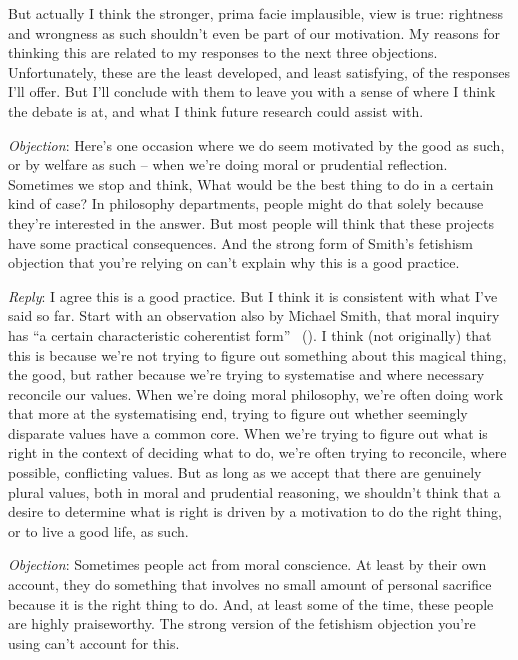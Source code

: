 \documentclass[
  10pt,
  letterpaper,
  DIV=11,
  numbers=noendperiod,
  twoside]{scrartcl}
\begin{document}
But actually I think the stronger, prima facie implausible, view is
true: rightness and wrongness as such shouldn't even be part of our
motivation. My reasons for thinking this are related to my responses to
the next three objections. Unfortunately, these are the least developed,
and least satisfying, of the responses I'll offer. But I'll conclude
with them to leave you with a sense of where I think the debate is at,
and what I think future research could assist with.

\emph{Objection}: Here's one occasion where we do seem motivated by the
good as such, or by welfare as such -- when we're doing moral or
prudential reflection. Sometimes we stop and think, What would be the
best thing to do in a certain kind of case? In philosophy departments,
people might do that solely because they're interested in the answer.
But most people will think that these projects have some practical
consequences. And the strong form of Smith's fetishism objection that
you're relying on can't explain why this is a good practice.

\emph{Reply}: I agree this is a good practice. But I think it is
consistent with what I've said so far. Start with an observation also by
Michael Smith, that moral inquiry has ``a certain characteristic
coherentist form'' ~(). I
think (not originally) that this is because we're not trying to figure
out something about this magical thing, the good, but rather because
we're trying to systematise and where necessary reconcile our values.
When we're doing moral philosophy, we're often doing work that more at
the systematising end, trying to figure out whether seemingly disparate
values have a common core. When we're trying to figure out what is right
in the context of deciding what to do, we're often trying to reconcile,
where possible, conflicting values. But as long as we accept that there
are genuinely plural values, both in moral and prudential reasoning, we
shouldn't think that a desire to determine what is right is driven by a
motivation to do the right thing, or to live a good life, as such.

\emph{Objection}: Sometimes people act from moral conscience. At least
by their own account, they do something that involves no small amount of
personal sacrifice because it is the right thing to do. And, at least
some of the time, these people are highly praiseworthy. The strong
version of the fetishism objection you're using can't account for this.
\end{document}
